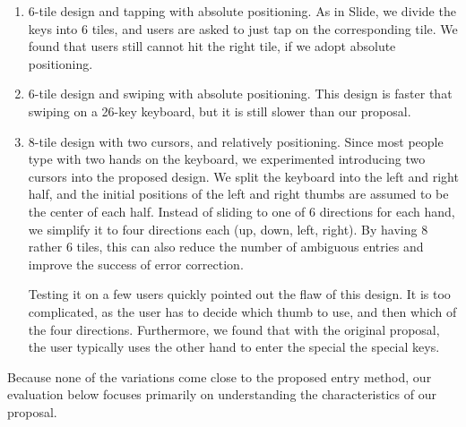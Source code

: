 \begin{enumerate}
\item
6-tile design and tapping with absolute positioning.  As in Slide, we divide the keys into 6 tiles, and users are asked to just tap on the corresponding tile.  We found that users still cannot hit the right tile, if we adopt absolute positioning.

\item
6-tile design and swiping with absolute positioning.  This design is faster that swiping on a 26-key keyboard, but it is still slower than our proposal. 

\item 
8-tile design with two cursors, and relatively positioning.  Since most people type with two hands on the keyboard, we experimented introducing two cursors into the proposed design.  We split the keyboard into the left and right half, and the initial positions of the left and right thumbs are assumed to be the center of each half.  Instead of sliding to one of 6 directions for each hand, we simplify it to four directions each (up, down, left,  right).  By having 8 rather 6 tiles, this can also reduce the number of ambiguous entries and improve the success of error correction.  

Testing it on a few users quickly pointed out the flaw of this design.  It is too complicated, as the user has to decide which thumb to use, and then which of the four directions.  Furthermore, we found that with the original proposal, the user typically uses the other hand to enter the special the special keys.
\end{enumerate}

Because none of the variations come close to the proposed entry method, our evaluation below focuses primarily on understanding the characteristics of our proposal. 

